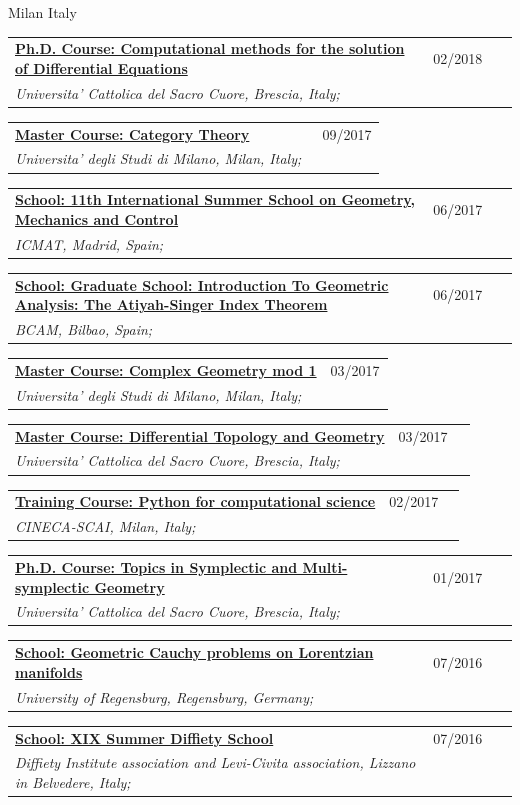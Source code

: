 \documentclass[a4paper]{article}
\newcommand{\longvoice}[8]{
	\begin{tabular}{p{0.83\linewidth} p{0.17\linewidth} }
		\textbf{\href{#3}{#2: #1}} & #4 
		\\ 
		\textit{#5, #6, #7;} & {\small\emph{#8}}
	\end{tabular}
	\vspace{.5em}
}
\begin{document}
		{Milan}
		{Italy}
		{}
	\longvoice{Computational methods for the solution of Differential Equations}
		{Ph.D. Course}
		{https://www.dropbox.com/s/q2rapau2k49n5t7/1802-Course-NumericalPdeAvella.pdf?dl=0}
		{02/2018}
		{Universita' Cattolica del Sacro Cuore}
		{Brescia}
		{Italy}
		{}
	\longvoice{Category Theory}
		{Master Course}
		{https://web.archive.org/web/20190831103757/http://www.mat.unimi.it/users/mantovani/}
		{09/2017}
		{Universita' degli Studi di Milano}
		{Milan}
		{Italy}
		{}
	\longvoice{11th International Summer School on Geometry, Mechanics and Control}
		{School}
		{https://web.archive.org/web/20170623165825/http://gmcnet.webs.ull.es/?q=activity-detaill/1812}
		{06/2017}
		{ICMAT}
		{Madrid}
		{Spain}
		{}
	\longvoice{Graduate School: Introduction To Geometric Analysis: The Atiyah-Singer Index Theorem}
		{School}
		{https://web.archive.org/web/20170623165642/http://www.bcamath.org/es/workshops/bcam-upv-ehu-graduate-school-geometry}
		{06/2017}
		{BCAM}
		{Bilbao}
		{Spain}
		{}
	\longvoice{Complex Geometry mod 1}
		{Master Course}
		{http://www.ccdmat.unimi.it/it/corsiDiStudio/2015/F4Yof1/F4Y-A/F4Y-114/F4Y-114.15.1/programma_it.html}
		{03/2017}
		{Universita' degli Studi di Milano}
		{Milan}
		{Italy}
		{}
	\longvoice{Differential Topology and Geometry}
		{Master Course}
		{http://docenti.unicatt.it/web/html/index.html\#/programmi/BS/2D8B/75017/2017/21065/MGH344/ita}
		{03/2017}
		{Universita' Cattolica del Sacro Cuore}
		{Brescia}
		{Italy}
		{}
	\longvoice{Python for computational science}
		{Training Course}
		{https://web.archive.org/web/20170623170252/https://eventi.cineca.it/en/hpc/python-computational-science}
		{02/2017}
		{CINECA-SCAI}
		{Milan}
		{Italy}
		{}
	\longvoice{Topics in Symplectic and Multi-symplectic Geometry}
		{Ph.D. Course}
		{https://web.archive.org/save/http://scuoledidottorato.unicatt.it/phdschools/science-10545.html}
		{01/2017}
		{Universita' Cattolica del Sacro Cuore}
		{Brescia}
		{Italy}
		{}
	\longvoice{Geometric Cauchy problems on Lorentzian manifolds}
		{School}
		{https://web.archive.org/web/20170623170457/http://www-app.uni-regensburg.de/Fakultaeten/MAT/GK/index.php/Summer_School_2016}
		{07/2016}
		{University of Regensburg}
		{Regensburg}
		{Germany}
		{}
	\longvoice{XIX Summer Diffiety School}
		{School}
		{https://web.archive.org/web/20170623170547/https://sites.google.com/site/levicivitainstitute//Activities/DiffietySchools/xix-summer-diffiety-school}
		{07/2016}
		{Diffiety Institute association and Levi-Civita association}
		{Lizzano in Belvedere}
		{Italy}
		{}
\end{document}
